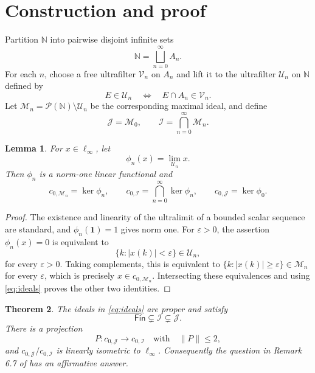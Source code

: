 \documentclass[10pt]{article}
\newtheorem{theorem}{Theorem}
\newtheorem{lemma}[theorem]{Lemma}
\newcommand{\N}{\mathbb N}
\newcommand{\I}{\mathcal I}
\newcommand{\J}{\mathcal J}
\newcommand{\M}{\mathcal M}
\newcommand{\U}{\mathcal U}
\newcommand{\Fin}{\mathsf{Fin}}
\newcommand{\linf}{\ell_\infty}
\begin{document}
\section{Construction and proof}

Partition $\N$ into pairwise disjoint infinite sets
\[
 \N=\bigsqcup_{n=0}^{\infty}A_n.
\]
For each $n$, choose a free ultrafilter $\mathcal V_n$ on $A_n$ and lift it
to the ultrafilter $\U_n$ on $\N$ defined by
\[
 E\in\U_n\quad\Longleftrightarrow\quad E\cap A_n\in\mathcal V_n.
\]
Let $\M_n=\mathcal P(\N)\setminus\U_n$ be the corresponding maximal ideal,
and define
\[
 \J=\M_0,
 \qquad
 \I=\bigcap_{n=0}^{\infty}\M_n.
 \tag{1}\label{eq:ideals}
\]

\begin{lemma}\label{lem:kernels}
For $x\in\linf$, let
\[
 \phi_n(x)=\lim_{\U_n}x.
\]
Then $\phi_n$ is a norm-one linear functional and
\[
 c_{0,\M_n}=\ker\phi_n,
 \qquad
 c_{0,\I}=\bigcap_{n=0}^{\infty}\ker\phi_n,
 \qquad
 c_{0,\J}=\ker\phi_0.
 \tag{2}\label{eq:kernels}
\]
\end{lemma}

\begin{proof}
The existence and linearity of the ultralimit of a bounded scalar sequence
are standard, and $\phi_n(\mathbf 1)=1$ gives norm one.  For
$\varepsilon>0$, the assertion $\phi_n(x)=0$ is equivalent to
\[
 \{k:|x(k)|<\varepsilon\}\in\U_n,
\]
for every $\varepsilon>0$.  Taking complements, this is equivalent to
$\{k:|x(k)|\geq\varepsilon\}\in\M_n$ for every $\varepsilon$, which is
precisely $x\in c_{0,\M_n}$.  Intersecting these equivalences and using
\eqref{eq:ideals} proves the other two identities.
\end{proof}

\begin{theorem}\label{thm:main}
The ideals in \eqref{eq:ideals} are proper and satisfy
\[
 \Fin\subsetneq\I\subsetneq\J.
\]
There is a projection
\[
 P:c_{0,\J}\longrightarrow c_{0,\I}
 \quad\text{with}\quad \|P\|\leq2,
\]
and $c_{0,\J}/c_{0,\I}$ is linearly isometric to $\linf$.
Consequently the question in Remark 6.7 of \cite{RU} has an affirmative
answer.
\end{theorem}
\end{document}
